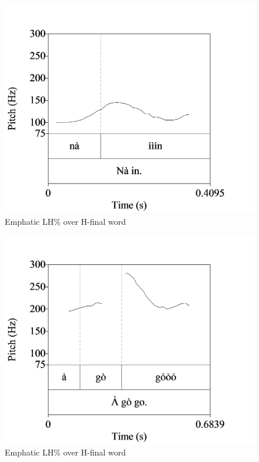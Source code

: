 
\begin{figure}
\caption{Emphatic LH\% over H-final word}
\label{fig:key:3.31}
\includegraphics[height=.3\textheight]{figures/yakpomod-img33.png}
\end{figure}

\begin{figure}
\caption{Emphatic LH\% over H-final word}
\label{fig:key:3.32}
\includegraphics[height=.3\textheight]{figures/yakpomod-img34.png}
\end{figure}  

